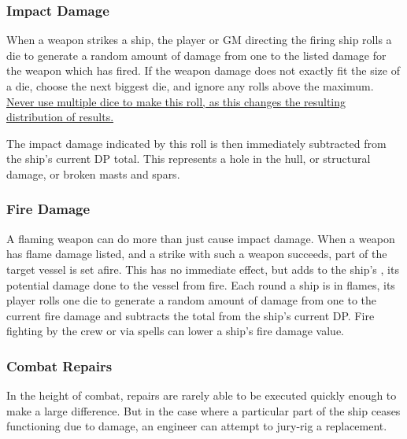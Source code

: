 \begin{multicols*}{2}


\subsubsection{Impact Damage}
When a weapon strikes a ship, the player or GM directing the firing ship rolls a die to generate a random amount of damage from one to the listed damage for the weapon which has fired. If the weapon damage does not exactly fit the size of a die, choose the next biggest die, and ignore any rolls above the maximum. \ul{Never use multiple dice to make this roll, as this changes the resulting distribution of results.}

The impact damage indicated by this roll is then immediately subtracted from the ship's current DP total. This represents a hole in the hull, or structural damage, or broken masts and spars.
\subsubsection{Fire Damage}
A flaming weapon can do more than just cause impact damage. When a weapon has flame damage listed, and a strike with such a weapon succeeds, part of the target vessel is set afire. This has no immediate effect, but adds to the ship's , its potential damage done to the vessel from fire. Each round a ship is in flames, its player rolls one
die to generate a random amount of damage from one to the
current fire damage and subtracts the total from the ship's
current DP. Fire fighting by the crew or via spells can lower a
ship's fire damage value.
\subsubsection{Combat Repairs}
In the height of combat, repairs are rarely able to be executed quickly enough to make a large difference. But in the case where a particular part of the ship ceases functioning due to damage, an engineer can attempt to jury-rig a replacement. 


\end{multicols*}
